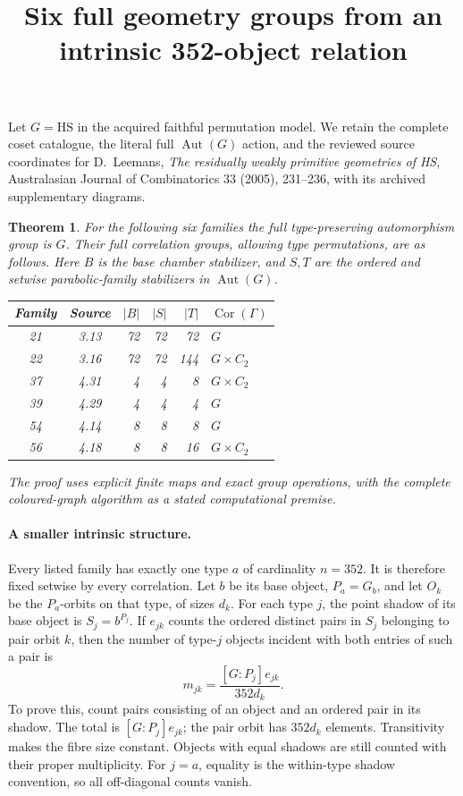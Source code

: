 \documentclass[11pt]{article}
\title{Six full geometry groups from an intrinsic 352-object relation}
\author{}\date{}
\newtheorem{theorem}{Theorem}
\newcommand{\Aut}{\operatorname{Aut}}\newcommand{\Cor}{\operatorname{Cor}}
\begin{document}
\maketitle
Let $G=\mathrm{HS}$ in the acquired faithful permutation model.
We retain the complete coset catalogue, the literal full $\Aut(G)$
action, and the reviewed source coordinates for D.~Leemans,
\emph{The residually weakly primitive geometries of HS},
Australasian Journal of Combinatorics 33 (2005), 231--236,
with its archived supplementary diagrams.

\begin{theorem}
For the following six families the full type-preserving automorphism
group is $G$. Their full correlation groups, allowing type permutations,
are as follows. Here $B$ is the base chamber stabilizer, and $S,T$ are
the ordered and setwise parabolic-family stabilizers in $\Aut(G)$.
\begin{center}
\begin{tabular}{ccrrrl}\toprule
Family&Source&$|B|$&$|S|$&$|T|$&$\Cor(\Gamma)$\\\midrule
21&3.13&72&72&72&$G$\\
22&3.16&72&72&144&$G\times C_2$\\
37&4.31&4&4&8&$G\times C_2$\\
39&4.29&4&4&4&$G$\\
54&4.14&8&8&8&$G$\\
56&4.18&8&8&16&$G\times C_2$\\\bottomrule
\end{tabular}
\end{center}
The proof uses explicit finite maps and exact group operations, with
the complete coloured-graph algorithm as a stated computational premise.
\end{theorem}

\paragraph{A smaller intrinsic structure.}
Every listed family has exactly one type $a$ of cardinality $n=352$.
It is therefore fixed setwise by every correlation. Let $b$ be its base
object, $P_a=G_b$, and let $O_k$ be the $P_a$-orbits on that type,
of sizes $d_k$. For each type $j$, the point shadow of its base object
is $S_j=b^{P_j}$. If $e_{jk}$ counts the ordered distinct pairs in
$S_j$ belonging to pair orbit $k$, then the number of type-$j$ objects
incident with both entries of such a pair is
\[
                 m_{jk}=\frac{[G:P_j]e_{jk}}{352d_k}.
\]
To prove this, count pairs consisting of an object and an ordered pair
in its shadow. The total is $[G:P_j]e_{jk}$; the pair orbit has
$352d_k$ elements. Transitivity makes the fibre size constant.
Objects with equal shadows are still counted with their proper
multiplicity. For $j=a$, equality is the within-type shadow convention,
so all off-diagonal counts vanish.
\end{document}
